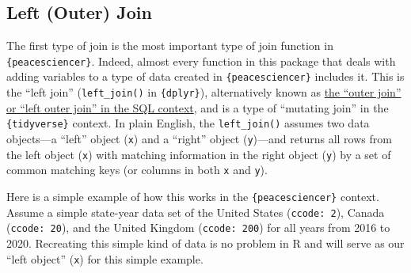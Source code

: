 \documentclass[
  11pt,
]{article}
\begin{document}
\hypertarget{left-outer-join}{%
\subsection{Left (Outer) Join}\label{left-outer-join}}

The first type of join is the most important type of join function in \texttt{\{peacesciencer\}}. Indeed, almost every function in this package that deals with adding variables to a type of data created in \texttt{\{peacesciencer\}} includes it. This is the ``left join'' (\texttt{left\_join()} in \texttt{\{dplyr\}}), alternatively known as \href{https://www.w3schools.com/sql/sql_join_left.asp}{the ``outer join'' or ``left outer join'' in the SQL context}, and is a type of ``mutating join'' in the \texttt{\{tidyverse\}} context. In plain English, the \texttt{left\_join()} assumes two data objects---a ``left'' object (\texttt{x}) and a ``right'' object (\texttt{y})---and returns all rows from the left object (\texttt{x}) with matching information in the right object (\texttt{y}) by a set of common matching keys (or columns in both \texttt{x} and \texttt{y}).

Here is a simple example of how this works in the \texttt{\{peacesciencer\}} context. Assume a simple state-year data set of the United States (\texttt{ccode:\ 2}), Canada (\texttt{ccode:\ 20}), and the United Kingdom (\texttt{ccode:\ 200}) for all years from 2016 to 2020. Recreating this simple kind of data is no problem in R and will serve as our ``left object'' (\texttt{x}) for this simple example.
\end{document}
